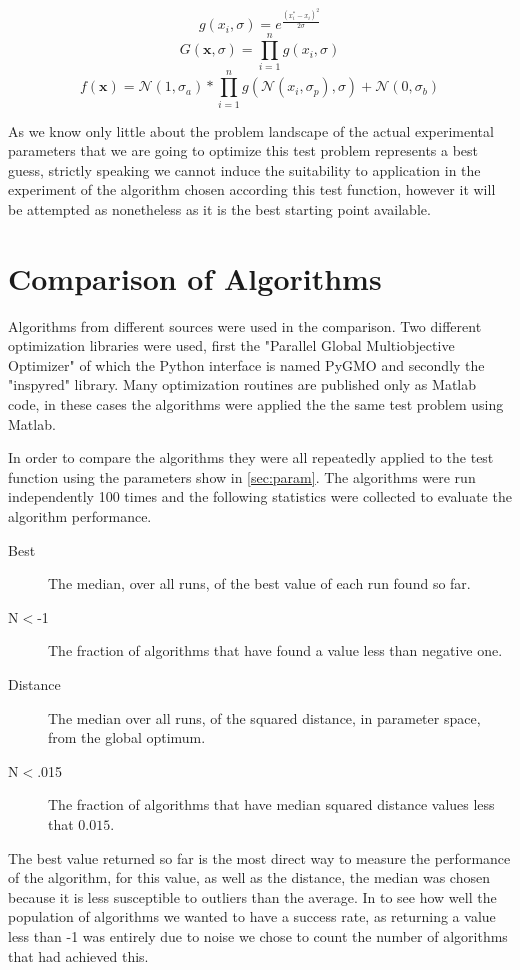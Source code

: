 \documentclass[a4paper,titlepage]{report}
\begin{document}
\[g(x_i,\sigma) = e^{\frac{(x_i^*-x_i)^2}{2\sigma}}\]
\[G(\mathbf{x},\sigma) = \prod_{i=1}^n g(x_i, \sigma)\]
\[f(\mathbf{x}) =  \mathcal{N}(1,\sigma_a) * \prod_{i=1}^n g(\mathcal{N}(x_i,\sigma_p), \sigma) + \mathcal{N}(0,\sigma_b) \]

As we know only little about the problem landscape of the actual experimental parameters that we are going to optimize this test problem represents a best guess, strictly speaking we cannot induce the suitability to application in the experiment of the algorithm chosen according this test function, however it will be attempted as nonetheless as it is the best starting point available.


\section{Comparison of Algorithms}

Algorithms from different sources were used in the comparison. Two different optimization libraries were used, first the  "Parallel Global Multiobjective Optimizer"\cite{pygmo} of which the Python interface is named PyGMO and secondly the "inspyred"\cite{inspyred} library. Many optimization routines are published only as Matlab code, in these cases the algorithms were applied the the same test problem using Matlab.

In order to compare the algorithms they were all repeatedly applied to the test function using the parameters show in \ref{sec:param}. The algorithms were run independently 100 times and the following statistics were collected to evaluate the algorithm performance.

\begin{description}
\item[Best] The median, over all runs, of the best value of each run found so far.
\item[N$<$-1] The fraction of algorithms that have found a value less than negative one.
\item[Distance] The median over all runs, of the squared distance, in parameter space,  from the global optimum.
\item[N$<$.015] The fraction of algorithms that have median squared distance values less that $0.015$.
\end{description}

The best value returned so far is the most direct way to measure the performance of the algorithm, for this value, as well as the distance, the median was chosen because it is less susceptible to outliers than the average. In to see how well the population of algorithms we wanted to have a success rate, as returning a value less than -1 was entirely due to noise we chose to count the number of algorithms that had achieved this.
\end{document}
